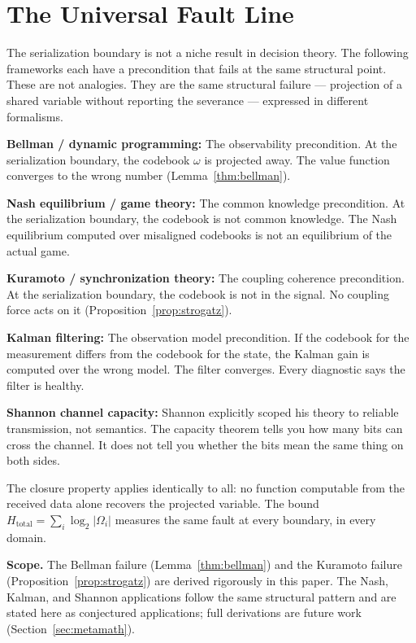 \documentclass[11pt,a4paper]{article}
\begin{document}
\section{The Universal Fault Line}
\label{sec:fault-line}

The serialization boundary is not a niche result in decision theory. 
The following frameworks each have a precondition that fails at the 
same structural point. These are not analogies. They are the same 
structural failure --- projection of a shared variable without 
reporting the severance --- expressed in different formalisms.

\textbf{Bellman / dynamic programming:} The observability 
precondition. At the serialization boundary, the codebook $\omega$ 
is projected away. The value function converges to the wrong number 
(Lemma~\ref{thm:bellman}).

\textbf{Nash equilibrium / game theory:} The common knowledge 
precondition. At the serialization boundary, the codebook is not 
common knowledge. The Nash equilibrium computed over misaligned 
codebooks is not an equilibrium of the actual game.

\textbf{Kuramoto / synchronization theory:} The coupling coherence 
precondition. At the serialization boundary, the codebook is not in 
the signal. No coupling force acts on it 
(Proposition~\ref{prop:strogatz}).

\textbf{Kalman filtering:} The observation model precondition. If 
the codebook for the measurement differs from the codebook for the 
state, the Kalman gain is computed over the wrong model. The filter 
converges. Every diagnostic says the filter is healthy.

\textbf{Shannon channel capacity:} Shannon explicitly scoped his 
theory to reliable transmission, not semantics. The capacity theorem 
tells you how many bits can cross the channel. It does not tell you 
whether the bits mean the same thing on both sides.

The closure property applies identically to all: no function 
computable from the received data alone recovers the projected 
variable. The bound $H_{\text{total}} = \sum_i \log_2 |\Omega_i|$ 
measures the same fault at every boundary, in every domain.

\textbf{Scope.} The Bellman failure (Lemma~\ref{thm:bellman}) and 
the Kuramoto failure (Proposition~\ref{prop:strogatz}) are derived 
rigorously in this paper. The Nash, Kalman, and Shannon applications 
follow the same structural pattern and are stated here as conjectured 
applications; full derivations are future work 
(Section~\ref{sec:metamath}).
\end{document}
